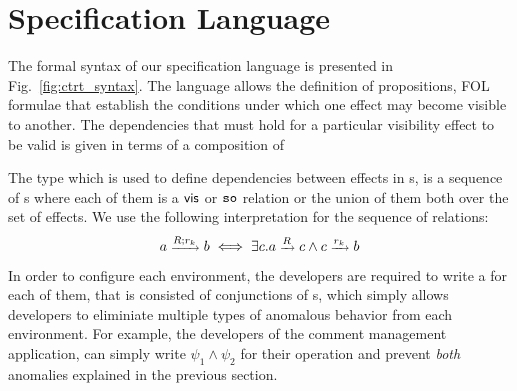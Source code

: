 \section {Specification Language} 
\label{sec:ctrt_language}

The formal syntax of our specification language is presented in
Fig.~\ref{fig:ctrt_syntax}.  The language allows the definition of
propositions, FOL formulae that establish the conditions under which
one effect may become visible to another.  The dependencies that must
hold for a particular visibility effect to be valid is given in
terms of a composition of 

The type \relationS{} which is used to define dependencies between
effects in \propS{}s, is a sequence of \seedS{}s where each of them is
a ${\normalfont \textsf{vis}}$ or ${\normalfont \texttt{so}}$ relation or the union of them both over the set of
effects. 
We use the following interpretation for the sequence of relations: 
\begin{equation} \scriptsize
a \xrightarrow{R;r_k} b \iff \exists c. a \xrightarrow{R} c
\wedge c \xrightarrow {r_k} b
\end{equation}

In order to configure each environment, the developers are
required to write a \specS{} for each of them, that is consisted of
conjunctions of \propS{}s, which simply allows developers to
eliminiate multiple types of anomalous behavior from each
environment. For example, the developers of the comment management
application, can simply write $\psi_1\wedge \psi_2$ for their \readC{}
operation and prevent \emph{both} anomalies explained in the previous
section.


